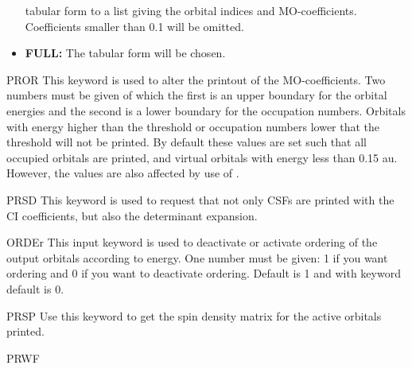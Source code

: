 \begin{keywordlist}
\begin{itemize}
tabular form to a list giving the orbital indices and MO-coefficients.
Coefficients smaller than 0.1 will be omitted.
\item{{\bf FULL:}} The tabular form will be chosen.
\end{itemize}
\item[PROR]
This keyword is used to alter the printout of the MO-coefficients.
Two numbers must be given of which the first is an upper boundary for the
orbital energies and the second is a lower boundary for the occupation
numbers.  Orbitals with energy higher than the threshold or occupation
numbers lower that the threshold will not be printed.
By default these
values are set such that all occupied orbitals are printed, and
virtual orbitals with energy less than 0.15 au. However, the values
are also affected by use of .
\item[PRSD]
This keyword is used to request that not only CSFs are printed with
the CI coefficients, but also the determinant expansion.
\item[ORDEr]
This input keyword is used to deactivate or activate ordering of the output orbitals
according to energy.
One number must be given: 1 if you want ordering
and 0 if you want to deactivate ordering. Default is 1 and with  keyword
default is 0.
\item[PRSP]
Use this keyword to get the spin density matrix for the active orbitals printed.
\item[PRWF]

\end{keywordlist}
